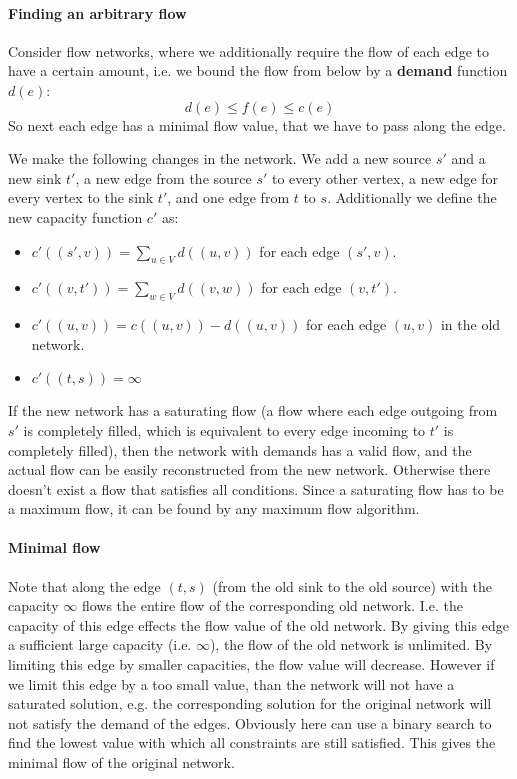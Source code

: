 \paragraph{Finding an arbitrary flow} Consider flow networks, 
where we additionally require the flow of each edge to have
a certain amount, i.e. we bound the flow from below by 
a \textbf{demand} function $d(e)$:
$$ d(e) \le f(e) \le c(e)$$
So next each edge has a minimal flow value, that we have to pass along the edge.

We make the following changes in the network.
We add a new source $s'$ and a new sink $t'$, a new edge from the source $s'$ to every other vertex, a new edge for every vertex to the sink $t'$, and one edge from $t$ to $s$.
Additionally we define the new capacity function $c'$ as:

\begin{itemize}
    \item $c'((s', v)) = \sum_{u \in V} d((u, v))$ for each edge $(s', v)$.
    \item $c'((v, t')) = \sum_{w \in V} d((v, w))$ for each edge $(v, t')$.
    \item $c'((u, v)) = c((u, v)) - d((u, v))$ for each edge $(u, v)$ in the old network.
    \item $c'((t, s)) = \infty$

\end{itemize}

If the new network has a saturating flow (a flow where each edge outgoing from $s'$ is completely filled, which is equivalent to every edge incoming to $t'$ is completely filled), then the network with demands has a valid flow, and the actual flow can be easily reconstructed from the new network.
Otherwise there doesn't exist a flow that satisfies all conditions.
Since a saturating flow has to be a maximum flow, it can be found by any maximum flow algorithm.

\paragraph{Minimal flow}
Note that along the edge $(t, s)$ (from the old sink to the old source) with the capacity $\infty$ flows the entire flow of the corresponding old network.
I.e. the capacity of this edge effects the flow value of the old network.
By giving this edge a sufficient large capacity (i.e. $\infty$), the flow of the old network is unlimited.
By limiting this edge by smaller capacities, the flow value will decrease.
However if we limit this edge by a too small value, than the network will not have a saturated solution, e.g. the corresponding solution for the original network will not satisfy the demand of the edges.
Obviously here can use a binary search to find the lowest value with which all constraints are still satisfied.
This gives the minimal flow of the original network.

